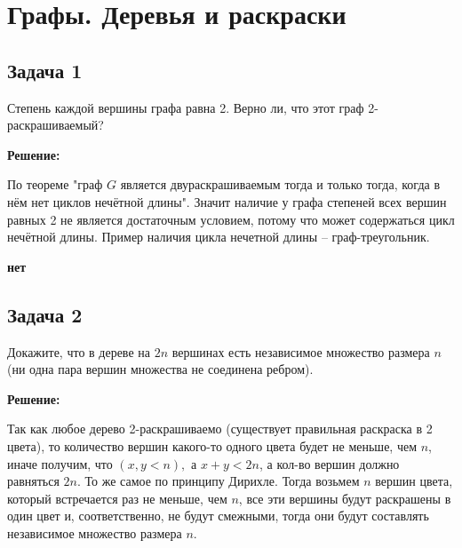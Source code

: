 \documentclass[a4paper,14pt]{article} %
\begin{document}
\begin{flushright}
\begin{large}
\textbf {}
\end{large}
\end{flushright}

\section{Графы. Деревья и раскраски}

\subsection{Задача 1}


Степень каждой вершины графа равна 2. Верно ли, что этот граф
2-раскрашиваемый?
\begin{center}
\bfseries
{\Large Решение: }
\end{center}

По теореме "граф $G$ является двураскрашиваемым тогда и только тогда, когда в
нём нет циклов нечётной длины". Значит наличие у графа степеней всех вершин равных 2 не является достаточным условием, потому что может содержаться цикл нечётной длины. Пример наличия цикла нечетной длины -- граф-треугольник.

\begin{flushright}
\begin{large}
\textbf {нет }
\end{large}
\end{flushright}

\begin{center}
\subsection{Задача 2}
\end{center}

Докажите, что в дереве на $2n$ вершинах есть независимое множество
размера $n$ (ни одна пара вершин множества не соединена ребром). 
\begin{center}
\bfseries
{\Large Решение: }
\end{center}

Так как любое дерево 2-раскрашиваемо (существует правильная раскраска в 2 цвета), то количество вершин какого-то одного цвета будет не меньше, чем $n$, иначе получим, что $(x,y<n),$ а $ x+y < 2n$, а кол-во вершин должно равняться $2n$. То же самое по принципу Дирихле. Тогда возьмем $n$ вершин цвета, который встречается раз не меньше, чем $n$, все эти вершины будут раскрашены в один цвет и, соответственно, не будут смежными, тогда они будут составлять независимое множество размера $n$.
\end{document}
